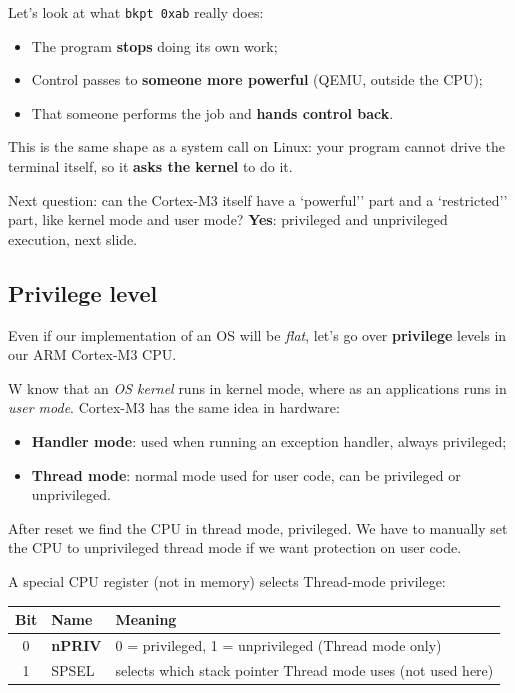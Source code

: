 \documentclass[a4paper,11pt]{article}
\begin{document}
Let's look at what \texttt{bkpt 0xab} really does:

\begin{itemize}
	\item The program \textbf{stops} doing its own work;
	\item Control passes to \textbf{someone more powerful} (QEMU, outside the CPU);
	\item That someone performs the job and \textbf{hands control back}.
\end{itemize}

This is the same shape as a system call on Linux: your program cannot drive the terminal itself, so it \textbf{asks the kernel} to do it.

Next question: can the Cortex-M3 itself have a `powerful'' part and a `restricted'' part, like kernel mode and user mode? \textbf{Yes}: privileged and unprivileged execution, next slide.

\subsection{Privilege level}

Even if our implementation of an OS will be \textit{flat}, let's go over \textbf{privilege} levels in our ARM Cortex-M3 CPU.

W know that an \textit{OS kernel} runs in kernel mode, where as an applications runs in \textit{user mode}. Cortex-M3 has the same idea in hardware:
\begin{itemize}
	\item \textbf{Handler mode}: used when running an exception handler, always privileged;
	\item \textbf{Thread mode}: normal mode used for user code, can be privileged or unprivileged.
\end{itemize}

After reset we find the CPU in thread mode, privileged.
We have to manually set the CPU to unprivileged thread mode if we want protection on user code.

A special CPU register (not in memory) selects Thread-mode privilege:

\begin{table}[h]
	\centering
	\begin{tabular}{c l l}
		\hline
		\textbf{Bit} & \textbf{Name}  & \textbf{Meaning}                                             \\
		\hline
		0            & \textbf{nPRIV} & 0 = privileged, 1 = unprivileged (Thread mode only)          \\
		1            & SPSEL          & selects which stack pointer Thread mode uses (not used here) \\
		\hline
	\end{tabular}
\end{table}
\end{document}
